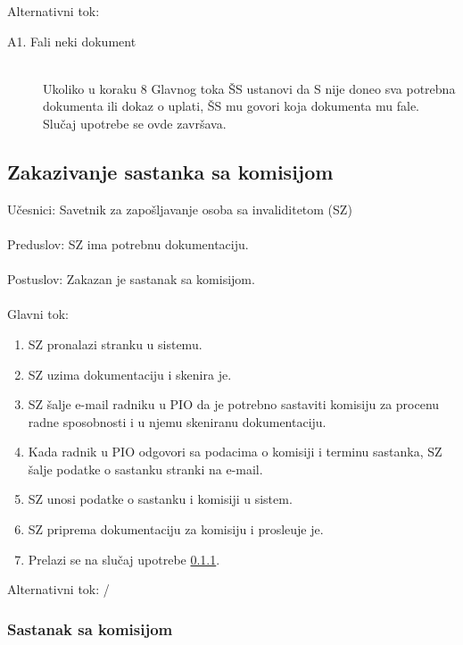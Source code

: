 \noindent Alternativni tok:
\begin{description}
	\item[A1. Fali neki dokument] ~\\
	Ukoliko u koraku 8 Glavnog toka \v SS ustanovi da S nije doneo sva potrebna dokumenta ili dokaz o uplati, \v SS mu govori koja dokumenta mu fale. Slu\v caj upotrebe se ovde zavr\v sava.
\end{description}

\subsection{Zakazivanje sastanka sa komisijom}

\label{su: zakazivanje sastanka}

\noindent U\v cesnici: Savetnik za zapo\v sljavanje osoba sa invaliditetom (SZ)
\\
\\ Preduslov: SZ ima potrebnu dokumentaciju.
\\
\\ Postuslov: Zakazan je sastanak sa komisijom.
\\
\\ Glavni tok:
\begin{enumerate}
	\item SZ pronalazi stranku u sistemu.
	\item SZ uzima dokumentaciju i skenira je.
	\item SZ \v salje e-mail radniku u PIO da je potrebno sastaviti komisiju za procenu radne sposobnosti i u njemu skeniranu dokumentaciju.
	\item Kada radnik u PIO odgovori sa podacima o komisiji i terminu sastanka, SZ \v salje podatke o sastanku stranki na e-mail.
	\item SZ unosi podatke o sastanku i komisiji u sistem.
	\item SZ priprema dokumentaciju za komisiju i prosle\dj uje je.
	\item Prelazi se na slu\v caj upotrebe \ref{su: sastanak}.
\end{enumerate}

\noindent Alternativni tok: /


\subsubsection{Sastanak sa komisijom}

\label{su: sastanak}

